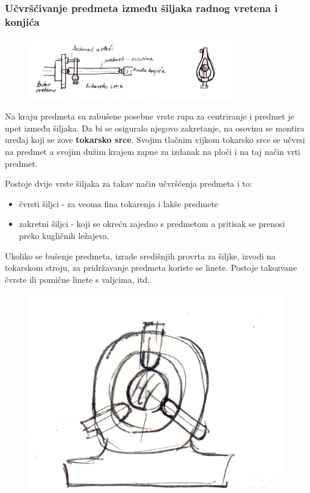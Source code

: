 \documentclass[a4paper,12pt]{article}
\numberwithin{figure}{section}
\begin{document}
\subsubsection{Učvršćivanje predmeta između šiljaka radnog vretena i konjića}
\begin{figure}[!h]
\centering
\includegraphics[width=0.8\textwidth]{image_18-1.png}
\end{figure}
\FloatBarrier
\par
Na kraju predmeta su zabušene posebne vrste rupa za centriranje i predmet je upet između šiljaka. Da bi se osiguralo njegovo zakretanje, na osovinu se montira uređaj koji se zove \textbf{tokarsko srce}. Svojim tlačnim vijkom tokarsko srce se učvrsi na predmet a svojim dužim krajem zapne za izdanak na ploči i na taj način vrti predmet.\par
Postoje dvije vrste šiljaka za takav način učvršćenja predmeta i to:
\begin{itemize}
\item čvrsti šiljci - za veoma fina tokarenja i lakše predmete
\item zakretni šiljci - koji se okreću zajedno s predmetom a pritisak se prenosi preko kugličnih ležajeva.
\end{itemize}
Ukoliko se bušenje predmeta, izrade središnjih provrta za šiljke, izvodi na tokarskom stroju, za pridržavanje predmeta koriste se linete. Postoje takozvane čvrste ili pomične linete s valjcima, itd.
\begin{figure}[!h]
\centering
\includegraphics[scale=0.15]{image_18-2.png}
\end{figure}
\clearpage
\end{document}
